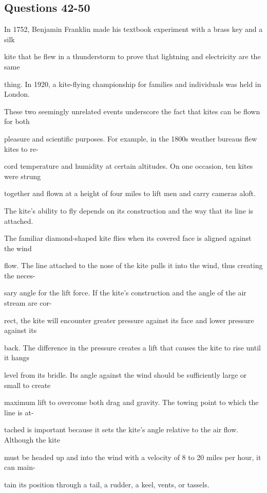 \documentclass[12pt]{article}
\begin{document}
\subsection*{Questions 42-50}
\begingroup
\small
\sloppy
\setlength{\parskip}{0pt}
\setlength{\parindent}{0pt}
In 1752, Benjamin Franklin made his textbook experiment with a brass key and a silk\par
kite that he flew in a thunderstorm to prove that lightning and electricity are the same\par
thing. In 1920, a kite-flying championship for families and individuals was held in London.\par
These two seemingly unrelated events underscore the fact that kites can be flown for both\par
pleasure and scientific purposes. For example, in the 1800s weather bureaus flew kites to re-\par
cord temperature and humidity at certain altitudes. On one occasion, ten kites were strung\par
together and flown at a height of four miles to lift men and carry cameras aloft.\par
The kite's ability to fly depends on its construction and the way that its line is attached.\par
The familiar diamond-shaped kite flies when its covered face is aligned against the wind\par
flow. The line attached to the nose of the kite pulls it into the wind, thus creating the neces-\par
sary angle for the lift force. If the kite's construction and the angle of the air stream are cor-\par
rect, the kite will encounter greater pressure against its face and lower pressure against its\par
back. The difference in the pressure creates a lift that causes the kite to rise until it hangs\par
level from its bridle. Its angle against the wind should be sufficiently large or small to create\par
maximum lift to overcome both drag and gravity. The towing point to which the line is at-\par
tached is important because it sets the kite's angle relative to the air flow. Although the kite\par
must be headed up and into the wind with a velocity of 8 to 20 miles per hour, it can main-\par
tain its position through a tail, a rudder, a keel, vents, or tassels.\par
\end{document}
